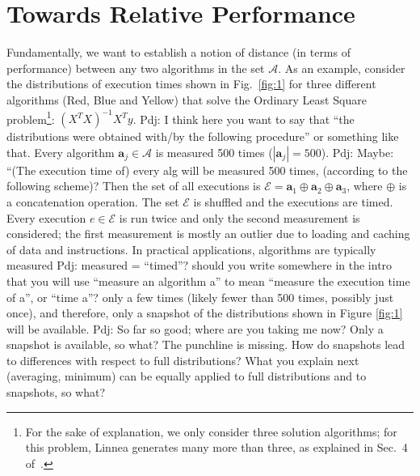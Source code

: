 \documentclass[conference]{IEEEtran}
\newcommand{\p}[1]{{\color{blue} Pdj: #1}}
\begin{document}
\section{Towards Relative Performance}
\label{sec:torel}
Fundamentally, we want to establish a notion of distance (in terms of performance) between any two algorithms in the set
$\mathcal{A}$. As an example, consider the distributions of execution times shown in Fig.~\ref{fig:1} for three different algorithms (Red, Blue and
Yellow) that solve the Ordinary Least Square problem\footnote{For the sake of
  explanation, we only consider three solution algorithms; for this problem, Linnea generates many more than three,
  as explained in Sec.~4 of~\cite{barthels2019linnea}.}: $(X^TX)^{-1}X^{T}y$. 
\p{I think here you want to say that ``the distributions were obtained with/by the following procedure'' or something
  like that.}
Every algorithm $\mathbf{a}_j \in \mathcal{A}$ is measured 500 times ($|\mathbf{a}_j| = 500$).
\p{Maybe: ``(The execution time of) every alg will be measured 500 times, (according to the following scheme)?}
Then the set of all executions is $\mathcal{E} = \mathbf{a}_1 \oplus \mathbf{a}_2 \oplus \mathbf{a}_3$, where $\oplus$
is a concatenation operation. The set $\mathcal{E}$ is shuffled and the executions are timed. Every execution $e \in
\mathcal{E}$ is run twice and only the second measurement is considered; the first measurement is mostly an outlier due
to loading and caching of data and instructions\cite{peise2019elaps}. In practical applications, algorithms are typically
measured \p{measured = ``timed''? should you write somewhere in the intro that you will use ``measure an
  algorithm a'' to mean ``measure the execution time of a'', or ``time a''?}
only a few times (likely fewer than 500 times, possibly just once), and therefore, only a snapshot of the distributions
shown in Figure \ref{fig:1} will be available.
\p{So far so good; where are you taking me now? Only a snapshot is available, so what? The punchline is missing.
  How do snapshots lead to differences with respect to full distributions? What you explain next (averaging, minimum)
  can be equally applied to full distributions and to snapshots, so what?}
\end{document}
